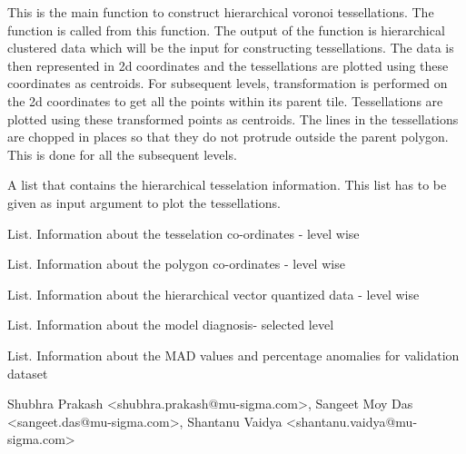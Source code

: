 %
\begin{Details}
This is the main function to construct hierarchical voronoi tessellations.
The  function is called from this function. The output of the
 function is hierarchical clustered data which will be the input
for constructing tessellations. The data is then represented in 2d
coordinates and the tessellations are plotted using these coordinates as
centroids. For subsequent levels, transformation is performed on the 2d
coordinates to get all the points within its parent tile. Tessellations are
plotted using these transformed points as centroids. The lines in the
tessellations are chopped in places so that they do not protrude outside the
parent polygon. This is done for all the subsequent levels.
\end{Details}
%
\begin{Value}
A list that contains the hierarchical tesselation information. This
list has to be given as input argument to plot the tessellations.
\begin{ldescription}
\item[\code{[[1]] }] List. Information about the tesselation co-ordinates - level
wise\item[\code{[[2]] }] List. Information about the polygon co-ordinates - level
wise
\item[\code{[[3]] }] List. Information about the hierarchical vector quantized data - level wise
\item[\code{[[4]] }] List. Information about the model diagnosis- selected level
\item[\code{[[5]] }] List. Information about the MAD values and percentage anomalies for validation dataset
\end{ldescription}
\end{Value}
%
\begin{Author}
Shubhra Prakash <shubhra.prakash@mu-sigma.com>, Sangeet Moy Das <sangeet.das@mu-sigma.com>, Shantanu Vaidya <shantanu.vaidya@mu-sigma.com>
\end{Author}
%
\begin{SeeAlso}
 \\{} 
\end{SeeAlso}
%
\begin{Examples}
\end{Examples}
